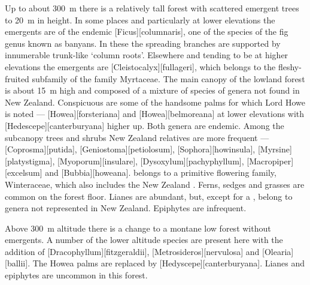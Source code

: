 Up to about \SI{300}{\metre} there is a relatively tall forest with scattered emergent trees to \SI{20}{\metre} in height.
In some places and particularly at lower elevations the emergents are of the endemic [Ficus][columnaris], one of the species of the fig genus known as banyans.
In these the spreading branches are supported by innumerable trunk-like `column roots'.
Elsewhere and tending to be at higher elevations the emergents are [Cleistocalyx][fullageri], which belongs to the fleshy-fruited subfamily of the family Myrtaceae.
The main canopy of the lowland forest is about \SI{15}{\metre} high and composed of a mixture of species of genera not found in New Zealand.
Conspicuous are some of the handsome palms for which Lord Howe is noted --- [Howea][forsteriana] and [Howea][belmoreana] at lower elevations with [Hedescepe][canterburyana] higher up.
Both genera are endemic.
Among the subcanopy trees and shrubs New Zealand relatives are more frequent --- [Coprosma][putida], [Geniostoma][petiolosum], [Sophora][howinsula], [Myrsine][platystigma], [Myoporum][insulare], [Dysoxylum][pachyphyllum], [Macropiper][excelsum] and [Bubbia][howeana].  belongs to a primitive flowering family, Winteraceae, which also includes the New Zealand .
Ferns, sedges and grasses are common on the forest floor.
Lianes are abundant, but, except for a , belong to genera not represented in New Zealand.
Epiphytes are infrequent.

Above \SI{300}{\metre} altitude there is a change to a montane low forest without emergents.
A number of the lower altitude species are present here with the addition of [Dracophyllum][fitzgeraldii], [Metrosideros][nervulosa] and [Olearia][ballii].
The Howea palms are replaced by [Hedyscepe][canterburyana].
Lianes and epiphytes are uncommon in this forest.


